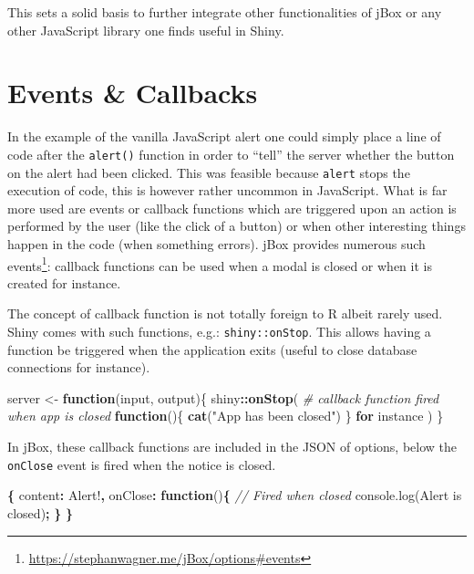 \documentclass[
]{krantz}
\makeatletter
\newenvironment{Shaded}{\begin{snugshade}}{\end{snugshade}}
\newcommand{\AttributeTok}[1]{\textcolor[rgb]{0.61,0.61,0.61}{#1}}
\newcommand{\CommentTok}[1]{\textcolor[rgb]{0.37,0.37,0.37}{\textit{#1}}}
\newcommand{\ControlFlowTok}[1]{\textcolor[rgb]{0.27,0.27,0.27}{\textbf{#1}}}
\newcommand{\DataTypeTok}[1]{\textcolor[rgb]{0.27,0.27,0.27}{#1}}
\newcommand{\KeywordTok}[1]{\textcolor[rgb]{0.27,0.27,0.27}{\textbf{#1}}}
\newcommand{\NormalTok}[1]{#1}
\newcommand{\OperatorTok}[1]{\textcolor[rgb]{0.43,0.43,0.43}{\textbf{#1}}}
\newcommand{\StringTok}[1]{\textcolor[rgb]{0.5,0.5,0.5}{#1}}
\newcommand{\VariableTok}[1]{\textcolor[rgb]{0,0,0}{#1}}
\renewcommand{\href}[2]{#2\footnote{\url{#1}}}
\newenvironment{kframe}{%
\medskip{}
\setlength{\fboxsep}{.8em}
 \def\at@end@of@kframe{}%
 \ifinner\ifhmode%
  \def\at@end@of@kframe{\end{minipage}}%
  \begin{minipage}{\columnwidth}%
 \fi\fi%
 \def\FrameCommand##1{\hskip\@totalleftmargin \hskip-\fboxsep
 \colorbox{shadecolor}{##1}\hskip-\fboxsep
     \hskip-\linewidth \hskip-\@totalleftmargin \hskip\columnwidth}%
 \MakeFramed {\advance\hsize-\width
   \@totalleftmargin\z@ \linewidth\hsize
   \@setminipage}}%
 {\par\unskip\endMakeFramed%
 \at@end@of@kframe}
\renewenvironment{Shaded}{\begin{kframe}}{\end{kframe}}
\makeatother
\begin{document}
This sets a solid basis to further integrate other functionalities of jBox or any other JavaScript library one finds useful in Shiny.

\hypertarget{events-callbacks}{%
\section*{Events \& Callbacks}\label{events-callbacks}}


In the example of the vanilla JavaScript alert one could simply place a line of code after the \texttt{alert()} function in order to ``tell'' the server whether the button on the alert had been clicked. This was feasible because \texttt{alert} stops the execution of code, this is however rather uncommon in JavaScript. What is far more used are events or callback functions which are triggered upon an action is performed by the user (like the click of a button) or when other interesting things happen in the code (when something errors). \href{https://stephanwagner.me/jBox/options\#events}{jBox provides numerous such events}: callback functions can be used when a modal is closed or when it is created for instance.

The concept of callback function is not totally foreign to R albeit rarely used. Shiny comes with such functions, e.g.: \texttt{shiny::onStop}. This allows having a function be triggered when the application exits (useful to close database connections for instance).

\begin{Shaded}
\begin{Highlighting}[]
\NormalTok{server <{-}}\StringTok{ }\ControlFlowTok{function}\NormalTok{(input, output)\{}
\NormalTok{  shiny}\OperatorTok{::}\KeywordTok{onStop}\NormalTok{(}
    \CommentTok{\# callback function fired when app is closed}
    \ControlFlowTok{function}\NormalTok{()\{}
      \KeywordTok{cat}\NormalTok{(}\StringTok{"App has been closed"}\NormalTok{)}
\NormalTok{    \} }\ControlFlowTok{for}\NormalTok{ instance}
\NormalTok{  )}
\NormalTok{\}}
\end{Highlighting}
\end{Shaded}

In jBox, these callback functions are included in the JSON of options, below the \texttt{onClose} event is fired when the notice is closed.

\begin{Shaded}
\begin{Highlighting}[]
\OperatorTok{\{}
  \DataTypeTok{content}\OperatorTok{:} \StringTok{\textquotesingle{}Alert!\textquotesingle{}}\OperatorTok{,}
  \DataTypeTok{onClose}\OperatorTok{:} \KeywordTok{function}\NormalTok{()}\OperatorTok{\{}
    \CommentTok{// Fired when closed }
    \VariableTok{console}\NormalTok{.}\AttributeTok{log}\NormalTok{(}\StringTok{\textquotesingle{}Alert is closed\textquotesingle{}}\NormalTok{)}\OperatorTok{;}
  \OperatorTok{\}}
\OperatorTok{\}}
\end{Highlighting}
\end{Shaded}
\end{document}
